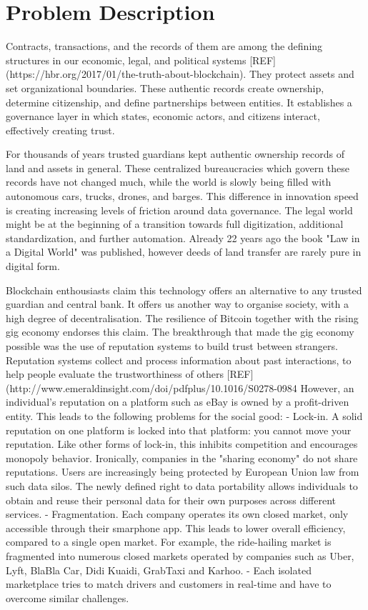 \documentclass[USenglish]{article}
\begin{document}
\section{Problem Description}

Contracts, transactions, and the records of them are among the defining structures in our economic, legal, and political systems [REF](https://hbr.org/2017/01/the-truth-about-blockchain).
They protect assets and set organizational boundaries.
These authentic records create ownership, determine citizenship, and define partnerships between entities.
It establishes a governance layer in which states, economic actors, and citizens interact, effectively creating trust.

For thousands of years trusted guardians kept authentic ownership records of land and assets in general.
These centralized bureaucracies which govern these records have not changed much, while the world is slowly being filled with autonomous cars, trucks, drones, and barges. 
This difference in innovation speed is creating increasing levels of friction around data governance. 
The legal world might be at the beginning of a transition towards full digitization, additional standardization, and further automation. 
Already 22 years ago the book "Law in a Digital World" was published, however deeds of land transfer are rarely pure in digital form.

Blockchain enthousiasts claim this technology offers an alternative to any trusted guardian and central bank.
It offers us another way to organise society, with a high degree of decentralisation.
The resilience of Bitcoin together with the rising gig economy endorses this claim.
The breakthrough that made the gig economy possible was the use of reputation systems to build trust between strangers.
Reputation systems collect and process information about past interactions, to help people evaluate the trustworthiness of others [REF](http://www.emeraldinsight.com/doi/pdfplus/10.1016/S0278-0984%
However, an individual’s reputation on a platform such as eBay is owned by a profit-driven entity.
This leads to the following problems for the social good:
- Lock-in. A solid reputation on one platform is locked into that platform: you cannot move your reputation. Like other forms of lock-in, this inhibits competition and encourages monopoly behavior. Ironically, companies in the "sharing economy" do not share reputations. Users are increasingly being protected by European Union law from such data silos. The newly defined right to data portability allows individuals to obtain and reuse their personal data for their own purposes across different services. 
- Fragmentation. Each company operates its own closed market, only accessible through their smarphone app. This leads to lower overall efficiency, compared to a single open market. For example, the ride-hailing market is fragmented into numerous closed markets operated by companies such as Uber, Lyft, BlaBla Car, Didi Kuaidi, GrabTaxi and Karhoo.
- Each isolated marketplace tries to match drivers and customers in real-time and have to overcome similar challenges.
\end{document}
